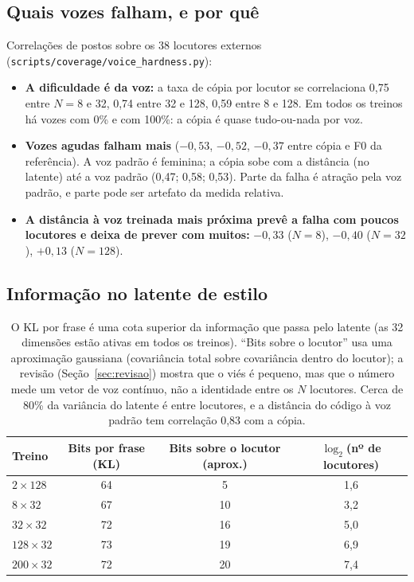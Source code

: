 \documentclass[a4paper,11pt]{article}
\begin{document}
\subsection{Quais vozes falham, e por quê}
\label{sec:porvoz}

Correlações de postos sobre os 38 locutores externos (\texttt{scripts/coverage/voice\_hardness.py}):
\begin{itemize}
\item \textbf{A dificuldade é da voz:} a taxa de cópia por locutor se correlaciona 0,75 entre $N=8$ e 32, 0,74 entre 32 e 128, 0,59 entre 8 e 128. Em todos os treinos há vozes com 0\% e com 100\%: a cópia é quase tudo-ou-nada por voz.
\item \textbf{Vozes agudas falham mais} ($-0{,}53$, $-0{,}52$, $-0{,}37$ entre cópia e F0 da referência). A voz padrão é feminina; a cópia sobe com a distância (no latente) até a voz padrão (0,47; 0,58; 0,53). Parte da falha é atração pela voz padrão, e parte pode ser artefato da medida relativa.
\item \textbf{A distância à voz treinada mais próxima prevê a falha com poucos locutores e deixa de prever com muitos:} $-0{,}33$ ($N=8$), $-0{,}40$ ($N=32$), $+0{,}13$ ($N=128$).
\end{itemize}

\subsection{Informação no latente de estilo}

\begin{table}[H]
\centering\small
\begin{tabular}{@{}lccc@{}}
\toprule
Treino & Bits por frase (KL) & Bits sobre o locutor (aprox.) & $\log_2$(nº de locutores)\\
\midrule
$2\times128$ & 64 & 5 & 1,6\\
$8\times32$ & 67 & 10 & 3,2\\
$32\times32$ & 72 & 16 & 5,0\\
$128\times32$ & 73 & 19 & 6,9\\
$200\times32$ & 72 & 20 & 7,4\\
\bottomrule
\end{tabular}
\caption{O KL por frase é uma cota superior da informação que passa pelo latente (as 32 dimensões estão ativas em todos os treinos). ``Bits sobre o locutor'' usa uma aproximação gaussiana (covariância total sobre covariância dentro do locutor); a revisão (Seção~\ref{sec:revisao}) mostra que o viés é pequeno, mas que o número mede um vetor de voz contínuo, não a identidade entre os $N$ locutores. Cerca de 80\% da variância do latente é entre locutores, e a distância do código à voz padrão tem correlação 0,83 com a cópia.}
\label{tab:info}
\end{table}
\end{document}
